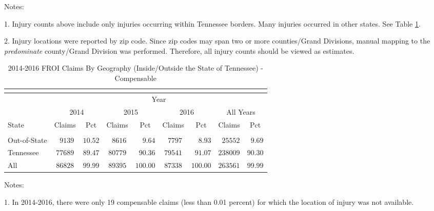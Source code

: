 \documentclass[9pt, oneside]{article}   	%
\begin{document}
    \begin{tablenotes}
      \small
      Notes:\\
      \item 1. Injury counts above include only injuries occurring within Tennessee borders.  Many injuries occurred in other states. See Table \ref{Table: State}.\\
       \item 2. Injury locations were reported by zip code. Since zip codes may span two or more counties/Grand Divisions, manual mapping to the \textit{predominate} county/Grand Division was performed. Therefore, all injury counts should be viewed as estimates.\\

      \end{tablenotes}
      
\begin{longtable}{lcccccccc}
\caption{2014-2016 FROI Claims By Geography (Inside/Outside the State of Tennessee) - Compensable}\\ 
\label{Table: State}\\
\hline
                  \toprule
 & \multicolumn{8}{c}{Year} \\ 
 & \multicolumn{2}{c}{2014} & \multicolumn{2}{c}{2015} & \multicolumn{2}{c}{2016} & \multicolumn{2}{c}{All Years} \\ 
State  & Claims & Pct & Claims & Pct & Claims & Pct & Claims & \multicolumn{1}{c}{Pct} \\ 
\midrule\\ [-1\normalbaselineskip]\hline\endhead\hline\endfoot
Out-of-State  & $\phantom{0}9139$ & $10.52$ & $\phantom{0}8616$ & $\phantom{00}9.64$ & $\phantom{0}7797$ & $\phantom{00}8.93$ & $\phantom{0}25552$ & $\phantom{0}9.69$ \\
Tennessee  & $77689$ & $89.47$ & $80779$ & $\phantom{0}90.36$ & $79541$ & $\phantom{0}91.07$ & $238009$ & $90.30$ \\
\cline{1-1} \cline{2-2} \cline{3-3} \cline{4-4} \cline{5-5} \cline{6-6} \cline{7-7} \cline{8-8} \cline{9-9}%
All  & $86828$ & $99.99$ & $89395$ & $100.00$ & $87338$ & $100.00$ & $263561$ & $99.99$ \\
\hline 
\end{longtable}

    \begin{tablenotes}
      \small
      Notes:\\
      \item 1. In 2014-2016, there were only 19 compensable claims (less than 0.01 percent) for which the location of injury was not available.\\


      \end{tablenotes}
\end{document}
